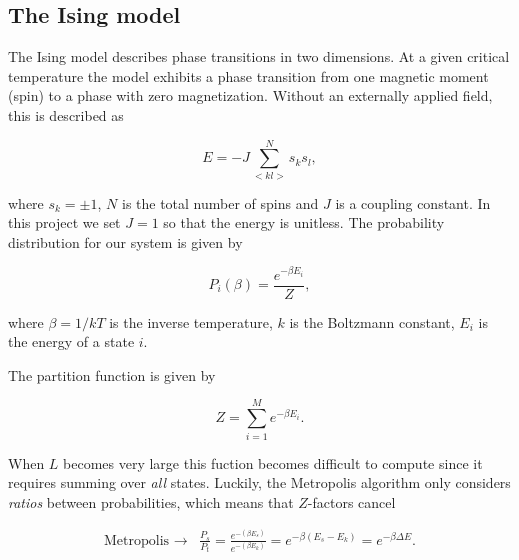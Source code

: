 \documentclass[11pt]{article}
\begin{document}
\subsection{The Ising model}

\begin{flushleft}
The Ising model describes phase transitions in two dimensions. At a given critical temperature the model exhibits a phase transition from one magnetic moment (spin) to a phase with zero magnetization. Without an externally applied field, this is described as

\begin{equation}
E = -J \sum^N_{<kl>} s_k s_l,
\end{equation}

where $s_k = \pm 1$, $N$ is the total number of spins and $J$ is a coupling constant. In this project we set $J=1$ so that the energy is unitless. The probability distribution for our system is given by

\begin{equation}
P_i(\beta) = \frac{e^{- \beta E_i}}{Z},
\end{equation}

where $\beta = 1/kT$ is the inverse temperature, $k$ is the Boltzmann constant, $E_i$ is the energy of a state $i$. 


The partition function is given by

\begin{equation}\label{Partition function}
Z = \sum_{i=1}^M e^{- \beta E_i}.
\end{equation}


\end{flushleft}

\begin{flushleft}

When $L$ becomes very large this fuction becomes difficult to compute since it requires summing over \textit{all} states. Luckily, the Metropolis algorithm only considers \textit{ratios} between probabilities, which means that $Z$-factors cancel

\begin{align*}
\text{Metropolis } \rightarrow  &\frac{P_s}{P_t} = \frac{e^{-(\beta E_s)}}{e^{-(\beta E_k)}}
= e^{-\beta(E_s - E_k)}
= e^{-\beta \Delta E}. 
\end{align*}

\end{flushleft}
\end{document}
